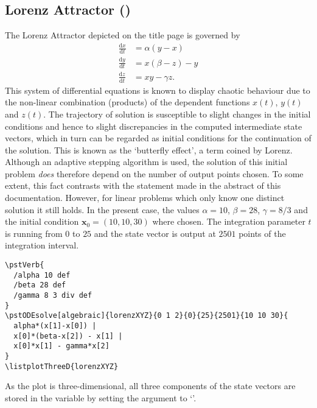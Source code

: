 \documentclass[11pt,english,BCOR10mm,DIV12,bibliography=totoc,parskip=false,smallheadings
    headexclude,footexclude,oneside,dvips]{pst-doc}
\begin{document}
\subsection[Lorenz Attractor]{Lorenz Attractor ()}
The Lorenz Attractor depicted on the title page is governed by
\begin{align*}
  \frac{\mathrm{d}x}{\mathrm{d}t}& = \alpha (y-x)\\
  \frac{\mathrm{d}y}{\mathrm{d}t}& = x(\beta-z)-y\\
  \frac{\mathrm{d}z}{\mathrm{d}t}& = x y - \gamma z.
\end{align*}
This system of differential equations is known to display chaotic behaviour due to the non-linear combination (products) of the dependent functions $x(t)$, $y(t)$ and $z(t)$. The trajectory of solution is susceptible to slight changes in the initial conditions and hence to slight discrepancies in the computed intermediate state vectors, which in turn can be regarded as initial conditions for the continuation of the solution. This is known as the `butterfly effect', a term coined by Lorenz. Although an adaptive stepping algorithm is used, the solution of this initial problem \emph{does} therefore depend on the number of output points chosen. To some extent, this fact contrasts with the statement made in the abstract of this documentation. However, for linear problems which only know one distinct solution it still holds. In the present case, the values $\alpha=10$, $\beta=28$, $\gamma=8/3$ and the initial condition $\mathbf{x}_0=(10,10,30)$ where chosen. The integration parameter $t$ is running from  $0$ to $25$ and the state vector is output at $2501$ points of the integration interval.

\begin{verbatim}
\pstVerb{
  /alpha 10 def
  /beta 28 def
  /gamma 8 3 div def
}
\pstODEsolve[algebraic]{lorenzXYZ}{0 1 2}{0}{25}{2501}{10 10 30}{
  alpha*(x[1]-x[0]) |
  x[0]*(beta-x[2]) - x[1] |
  x[0]*x[1] - gamma*x[2]
}
\listplotThreeD{lorenzXYZ}
\end{verbatim}
As the plot is three-dimensional, all three components of the state vectors are stored in the \PS{} variable  by setting the  argument to `'.
\end{document}
